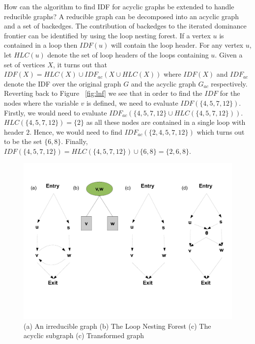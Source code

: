     How can the algorithm to find IDF for acyclic graphs be extended to handle reducible graphs? 
    A reducible graph can be
    decomposed into an acyclic graph and a set of backedges. The contribution of backedges to the
    iterated dominance frontier can be identified by using the loop nesting forest. If a vertex $u$
    is contained in a loop then $IDF(u)$ will contain the loop header. For any vertex $u$, let $HLC(u)$
    denote the set of loop headers of the loops containing $u$. Given a set of vertices $X$, it turns
    out that $IDF(X) = HLC(X) \cup IDF_{ac}(X \cup HLC(X))$ where $IDF(X)$ and $IDF_{ac}$
    denote the IDF over the original graph $G$ and the acyclic graph $G_{ac}$ respectively. Reverting
    back to Figure ~\ref{fig:lnf} we see that in order to find the $IDF$ for the nodes where the variable 
    $v$ is defined, we need to evaluate $IDF(\{4,5,7,12\})$. Firstly, we would need to evaluate 
    $IDF_{ac}(\{4,5,7,12\} \cup HLC(\{4,5,7,12\}))$. $HLC(\{4,5,7,12\}) = \{2\}$ as all these nodes are contained 
    in a single loop with header $2$. Hence, we would need to find $IDF_{ac}(\{2,4,5,7,12\})$ which turns
    out to be the set $\{6,8\}$. Finally, $IDF(\{4,5,7,12\}) = HLC(\{4,5,7,12\}) \cup \{6,8\} = \{2,6,8\}$.
 
    \begin{figure}[htb]
    \centerline{\includegraphics[scale=0.3]{irred.pdf}}
    \caption{(a) An irreducible graph (b) The Loop Nesting Forest (c) The acyclic subgraph (c) Transformed
    graph}
    \label{fig:irred}
    \end{figure} 
 
